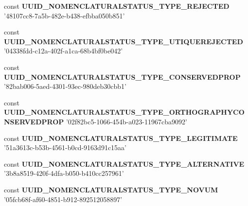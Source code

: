 \begin{DoxyCompactItemize}
\item 
\hypertarget{uuids_8php_abdcfcd1cede9df605a1800e1fe60be8b}{const {\bfseries U\-U\-I\-D\-\_\-\-N\-O\-M\-E\-N\-C\-L\-A\-T\-U\-R\-A\-L\-S\-T\-A\-T\-U\-S\-\_\-\-T\-Y\-P\-E\-\_\-\-R\-E\-J\-E\-C\-T\-E\-D} '48107cc8-\/7a5b-\/482e-\/b438-\/efbba050b851'}\label{uuids_8php_abdcfcd1cede9df605a1800e1fe60be8b}

\item 
\hypertarget{uuids_8php_af5b93c9083d1452cf882aec808b0360b}{const {\bfseries U\-U\-I\-D\-\_\-\-N\-O\-M\-E\-N\-C\-L\-A\-T\-U\-R\-A\-L\-S\-T\-A\-T\-U\-S\-\_\-\-T\-Y\-P\-E\-\_\-\-U\-T\-I\-Q\-U\-E\-R\-E\-J\-E\-C\-T\-E\-D} '04338fdd-\/c12a-\/402f-\/a1ca-\/68b4bf0be042'}\label{uuids_8php_af5b93c9083d1452cf882aec808b0360b}

\item 
\hypertarget{uuids_8php_a82733d57344700f378993dcf45adbfc9}{const {\bfseries U\-U\-I\-D\-\_\-\-N\-O\-M\-E\-N\-C\-L\-A\-T\-U\-R\-A\-L\-S\-T\-A\-T\-U\-S\-\_\-\-T\-Y\-P\-E\-\_\-\-C\-O\-N\-S\-E\-R\-V\-E\-D\-P\-R\-O\-P} '82bab006-\/5aed-\/4301-\/93ec-\/980deb30cbb1'}\label{uuids_8php_a82733d57344700f378993dcf45adbfc9}

\item 
\hypertarget{uuids_8php_a67ccf645253e67e05d05b0fd2138b55d}{const {\bfseries U\-U\-I\-D\-\_\-\-N\-O\-M\-E\-N\-C\-L\-A\-T\-U\-R\-A\-L\-S\-T\-A\-T\-U\-S\-\_\-\-T\-Y\-P\-E\-\_\-\-O\-R\-T\-H\-O\-G\-R\-A\-P\-H\-Y\-C\-O\-N\-S\-E\-R\-V\-E\-D\-P\-R\-O\-P} '02f82bc5-\/1066-\/454b-\/a023-\/11967cba9092'}\label{uuids_8php_a67ccf645253e67e05d05b0fd2138b55d}

\item 
\hypertarget{uuids_8php_aceb961d733373bfe698ed5d323725acd}{const {\bfseries U\-U\-I\-D\-\_\-\-N\-O\-M\-E\-N\-C\-L\-A\-T\-U\-R\-A\-L\-S\-T\-A\-T\-U\-S\-\_\-\-T\-Y\-P\-E\-\_\-\-L\-E\-G\-I\-T\-I\-M\-A\-T\-E} '51a3613c-\/b53b-\/4561-\/b0cd-\/9163d91c15aa'}\label{uuids_8php_aceb961d733373bfe698ed5d323725acd}

\item 
\hypertarget{uuids_8php_a7fc2f3f1478f9456506bc89fa6727958}{const {\bfseries U\-U\-I\-D\-\_\-\-N\-O\-M\-E\-N\-C\-L\-A\-T\-U\-R\-A\-L\-S\-T\-A\-T\-U\-S\-\_\-\-T\-Y\-P\-E\-\_\-\-A\-L\-T\-E\-R\-N\-A\-T\-I\-V\-E} '3b8a8519-\/420f-\/4dfa-\/b050-\/b410cc257961'}\label{uuids_8php_a7fc2f3f1478f9456506bc89fa6727958}

\item 
\hypertarget{uuids_8php_ab4726982feefb97aa06a3145d29773cc}{const {\bfseries U\-U\-I\-D\-\_\-\-N\-O\-M\-E\-N\-C\-L\-A\-T\-U\-R\-A\-L\-S\-T\-A\-T\-U\-S\-\_\-\-T\-Y\-P\-E\-\_\-\-N\-O\-V\-U\-M} '05fcb68f-\/af60-\/4851-\/b912-\/892512058897'}\label{uuids_8php_ab4726982feefb97aa06a3145d29773cc}


\end{DoxyCompactItemize}
